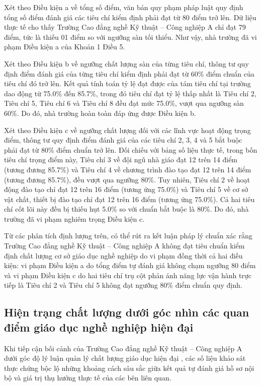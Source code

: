 Xét theo Điều kiện a về tổng số điểm, văn bản quy phạm pháp luật quy định tổng số điểm đánh giá các tiêu chí kiểm định phải đạt từ 80 điểm trở lên. Dữ liệu thực tế cho thấy Trường Cao đẳng nghề Kỹ thuật -- Công nghiệp A chỉ đạt 79 điểm, tức là thiếu 01 điểm so với ngưỡng sàn tối thiểu. Như vậy, nhà trường đã vi phạm Điều kiện a của Khoản 1 Điều 5.

Xét theo Điều kiện b về ngưỡng chất lượng sàn của từng tiêu chí, thông tư quy định điểm đánh giá của từng tiêu chí kiểm định phải đạt từ 60\% điểm chuẩn của tiêu chí đó trở lên. Kết quả tính toán tỷ lệ đạt được của tám tiêu chí tại trường dao động từ 75.0\% đến 85.7\%, trong đó tiêu chí đạt tỷ lệ thấp nhất là Tiêu chí 2, Tiêu chí 5, Tiêu chí 6 và Tiêu chí 8 đều đạt mức 75.0\%, vượt qua ngưỡng sàn 60\%. Do đó, nhà trường hoàn toàn đáp ứng được Điều kiện b.

Xét theo Điều kiện c về ngưỡng chất lượng đối với các lĩnh vực hoạt động trọng điểm, thông tư quy định điểm đánh giá của các tiêu chí 2, 3, 4 và 5 bắt buộc phải đạt từ 80\% điểm chuẩn trở lên. Đối chiếu với bảng số liệu thực tế, trong bốn tiêu chí trọng điểm này, Tiêu chí 3 về đội ngũ nhà giáo đạt 12 trên 14 điểm (tương đương 85.7\%) và Tiêu chí 4 về chương trình đào tạo đạt 12 trên 14 điểm (tương đương 85.7\%), đều vượt qua ngưỡng 80\%. Tuy nhiên, Tiêu chí 2 về hoạt động đào tạo chỉ đạt 12 trên 16 điểm (tương ứng 75.0\%) và Tiêu chí 5 về cơ sở vật chất, thiết bị đào tạo chỉ đạt 12 trên 16 điểm (tương ứng 75.0\%). Cả hai tiêu chí cốt lõi này đều bị thiếu hụt 5.0\% so với chuẩn bắt buộc là 80\%. Do đó, nhà trường đã vi phạm nghiêm trọng Điều kiện c.

Từ các phân tích định lượng trên, có thể rút ra kết luận pháp lý chuẩn xác rằng Trường Cao đẳng nghề Kỹ thuật -- Công nghiệp A không đạt tiêu chuẩn kiểm định chất lượng cơ sở giáo dục nghề nghiệp do vi phạm đồng thời cả hai điều kiện: vi phạm Điều kiện a do tổng điểm tự đánh giá không chạm ngưỡng 80 điểm và vi phạm Điều kiện c do hai tiêu chí trụ cột phản ánh năng lực vận hành trực tiếp là Tiêu chí 2 và Tiêu chí 5 không đạt ngưỡng 80\% điểm chuẩn quy định.

\subsection{Hiện trạng chất lượng dưới góc nhìn các quan điểm giáo dục nghề nghiệp hiện đại}

Khi tiếp cận bối cảnh của Trường Cao đẳng nghề Kỹ thuật -- Công nghiệp A dưới góc độ lý luận quản lý chất lượng giáo dục hiện đại \parencite{trankhanhduc2004, phamthanhnghi2000}, các số liệu khảo sát thực chứng bộc lộ những khoảng cách sâu sắc giữa kết quả tự đánh giá hồ sơ nội bộ và giá trị thụ hưởng thực tế của các bên liên quan.

